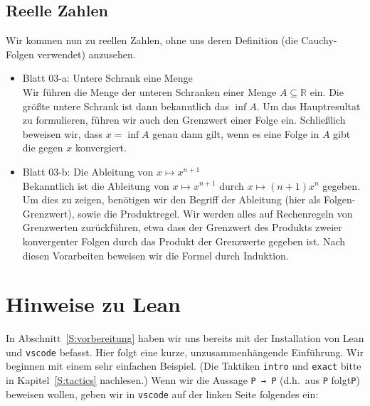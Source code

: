 \documentclass[11pt]{article}
\newcommand{\leanin}{\texttt}
\newcommand{\leanstate}{\texttt}
\begin{document}
\subsection{Reelle Zahlen}
Wir kommen nun zu reellen Zahlen, ohne uns deren Definition (die Cauchy-Folgen verwendet) anzusehen. 
\begin{itemize}
\item Blatt 03-a: Untere Schrank eine Menge\\ %
Wir führen die Menge der unteren Schranken einer Menge $A \subseteq \mathbb R$ ein. Die größte untere Schrank ist dann bekanntlich das $\inf A$. Um das Hauptresultat zu formulieren, führen wir auch den Grenzwert einer Folge ein. Schließlich beweisen wir, dass $x = \inf A$ genau dann gilt, wenn es eine Folge in $A$ gibt die gegen $x$ konvergiert.
\item Blatt 03-b: Die Ableitung von $x\mapsto x^{n+1}$\\ %
  Bekanntlich ist die Ableitung von $x\mapsto x^{n+1}$ durch $x\mapsto (n+1)x^n$ gegeben. Um dies zu zeigen, benötigen wir den Begriff der Ableitung (hier als Folgen-Grenzwert), sowie die Produktregel. Wir werden alles auf Rechenregeln von Grenzwerten zurückführen, etwa dass der Grenzwert des Produkts zweier konvergenter Folgen durch das Produkt der Grenzwerte gegeben ist. Nach diesen Vorarbeiten beweisen wir die Formel durch Induktion.
\end{itemize}    

\section{Hinweise zu Lean} %
\label{S:lean}
In Abschnitt~\ref{S:vorbereitung} haben wir uns bereits mit der Installation von Lean und {\tt vscode} befasst. Hier folgt eine kurze, unzusammenhängende Einführung. Wir beginnen mit einem sehr einfachen Beispiel. (Die Taktiken \leanin{intro} und \leanin{exact} bitte in Kapitel~\ref{S:tactics} nachlesen.) Wenn wir die Aussage \leanstate{P → P} (d.h.\ aus \leanstate{P} folgt\leanstate{P}) beweisen wollen, geben wir in \leanstate{vscode} auf der linken Seite folgendes ein:
\end{document}

